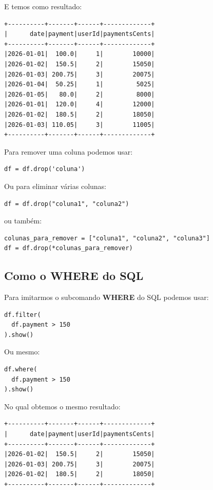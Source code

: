 E temos como resultado:
\begin{verbatim}
+----------+-------+------+-------------+
|      date|payment|userId|paymentsCents|
+----------+-------+------+-------------+
|2026-01-01|  100.0|     1|        10000|
|2026-01-02|  150.5|     2|        15050|
|2026-01-03| 200.75|     3|        20075|
|2026-01-04|  50.25|     1|         5025|
|2026-01-05|   80.0|     2|         8000|
|2026-01-01|  120.0|     4|        12000|
|2026-01-02|  180.5|     2|        18050|
|2026-01-03| 110.05|     3|        11005|
+----------+-------+------+-------------+	
\end{verbatim}

Para remover uma coluna podemos usar:

\begin{lstlisting}[]
df = df.drop('coluna')
\end{lstlisting}

Ou para eliminar várias colunas:
\begin{lstlisting}[]
df = df.drop("coluna1", "coluna2")	
\end{lstlisting}

ou também:
\begin{lstlisting}[]
colunas_para_remover = ["coluna1", "coluna2", "coluna3"]
df = df.drop(*colunas_para_remover)	
\end{lstlisting}

\subsection{Como o WHERE do SQL}
Para imitarmos o subcomando \textbf{WHERE} do SQL podemos usar:
\begin{lstlisting}[]
df.filter(
  df.payment > 150
).show()	
\end{lstlisting}

Ou mesmo:
\begin{lstlisting}[]
df.where(
  df.payment > 150
).show()	
\end{lstlisting}

No qual obtemos o mesmo resultado:
\begin{verbatim}
+----------+-------+------+-------------+
|      date|payment|userId|paymentsCents|
+----------+-------+------+-------------+
|2026-01-02|  150.5|     2|        15050|
|2026-01-03| 200.75|     3|        20075|
|2026-01-02|  180.5|     2|        18050|
+----------+-------+------+-------------+	
\end{verbatim}

